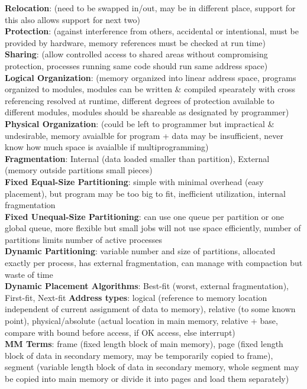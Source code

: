\documentclass[a4paper]{article}
\begin{document}
\begin{multicols}{2}
        \textbf{Relocation}: (need to be swapped in/out, may be in different place, support for this also allows support for next two)\\
        \textbf{Protection}: (against interference from others, accidental or intentional, must be provided by hardware, memory references must be checked at run time)\\
        \textbf{Sharing}: (allow controlled access to shared areas without compromising protection, processes running same code should run same address space)\\
        \textbf{Logical Organization}: (memory organized into linear address space, programs organized to modules, modules can be written \& compiled spearately with cross referencing resolved at runtime, different degrees of protection available to different modules, modules should be shareable as designated by programmer)\\
        \textbf{Physical Organization}: (could be left to programmer but impractical \& undesirable, memory avaialble for program + data may be insufficient, never know how much space is avaialble if multiprogramming)\\
        \textbf{Fragmentation}: Internal (data loaded smaller than partition), External (memory outside partitions small pieces)\\
        \textbf{Fixed Equal-Size Partitioning}: simple with minimal overhead (easy placement), but program may be too big to fit, inefficient utilization, internal fragmentation\\
        \textbf{Fixed Unequal-Size Partitioning}: can use one queue per partition or one global queue, more flexible but small jobs will not use space efficiently, number of partitions limits number of active processes\\
        \textbf{Dynamic Partitioning}: variable number and size of partitions, allocated exactly per process, has external fragmentation, can manage with compaction but waste of time\\
        \textbf{Dynamic Placement Algorithms}: Best-fit (worst, external fragmentation), First-fit, Next-fit
        \textbf{Address types}: logical (reference to memory location independent of current assignment of data to memory), relative (to some known point), physical/absolute (actual location in main memory, relative + base, compare with bound before access, if OK access, else interrupt)\\
        \textbf{MM Terms}: frame (fixed length block of main memory), page (fixed length block of data in secondary memory, may be temporarily copied to frame), segment (variable length block of data in secondary memory, whole segment may be copied into main memory or divide it into pages and load them separately)\\

\end{multicols}
\end{document}
